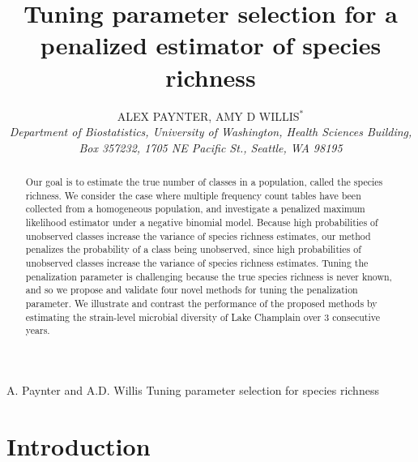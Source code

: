 \documentclass[oupdraft]{bio}
\begin{document}
\title{Tuning parameter selection for a penalized estimator of species richness}

\author{ALEX PAYNTER, AMY D WILLIS$^\ast$\\[4pt]
\textit{Department of Biostatistics,
University of Washington,
Health Sciences Building, Box 357232,
1705 NE Pacific St., Seattle, WA 98195}
}

\markboth%
{A. Paynter and A.D. Willis}
{Tuning parameter selection for species richness}

\maketitle


\begin{abstract}
{Our goal is to estimate the true number of classes in a population, called the species richness.  We consider the case where multiple frequency count tables have been collected from a homogeneous population, and investigate a penalized maximum likelihood estimator under a negative binomial model.
Because high probabilities of unobserved classes increase the variance of species richness estimates,
our method penalizes the probability of a class being unobserved, since high probabilities of unobserved classes increase the variance of species richness estimates. Tuning the penalization parameter is challenging because the true species richness is never known, and so we propose and validate four novel methods for tuning the penalization parameter.  We illustrate and contrast the performance of the proposed methods by estimating the strain-level microbial diversity of Lake Champlain over 3 consecutive years.}
\end{abstract}


\section{Introduction}
\label{sec:introduction}
\end{document}
